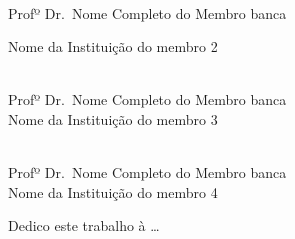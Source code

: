 \documentclass[
  12pt,		%
  a4paper,	%
  openright,  %
  oneside,	%
  chapter=TITLE,		%
  section=TITLE,		%
  english,	%
  french,	    %
  spanish,	%
  brazil	    %
]{abntex2}
\newcommand{\nomeDoMembroB}{Nome Completo do Membro banca}
\newcommand{\tituloDoMembroB}{Profº Dr.}
\newcommand{\instituicaomembroB}{Nome da Instituição do membro 2}
\newcommand{\nomeDoMembroC}{Nome Completo do Membro banca}
\newcommand{\tituloDoMembroC}{Profº Dr.}
\newcommand{\instituicaomembroC}{Nome da Instituição do membro 3}
\newcommand{\nomeDoMembroD}{Nome Completo do Membro banca}
\newcommand{\tituloDoMembroD}{Profº Dr.}
\newcommand{\instituicaomembroD}{Nome da Instituição do membro 4}
\begin{document}
\begin{folhadeaprovacao}
       \vspace*{1cm}
       
       \raggedright\makebox[2.5in]{\hrulefill}\\
       \tituloDoMembroB\ \nomeDoMembroB \par \instituicaomembroB
       
       \vspace*{1cm}
       
       \raggedright\makebox[2.5in]{\hrulefill}\\
       \tituloDoMembroC\ \nomeDoMembroC \\ \instituicaomembroC
       
       \vspace*{1cm}
       
       \raggedright\makebox[2.5in]{\hrulefill}\\
       \tituloDoMembroD\ \nomeDoMembroD \\ \instituicaomembroD
       
    \end{folhadeaprovacao}
    
   
    
    \begin{dedicatoria}
        \vspace*{\fill}
        \begin{flushright}
                       Dedico este trabalho à … 
        \end{flushright}
        \vspace*{1cm}
    \end{dedicatoria}
\end{document}
